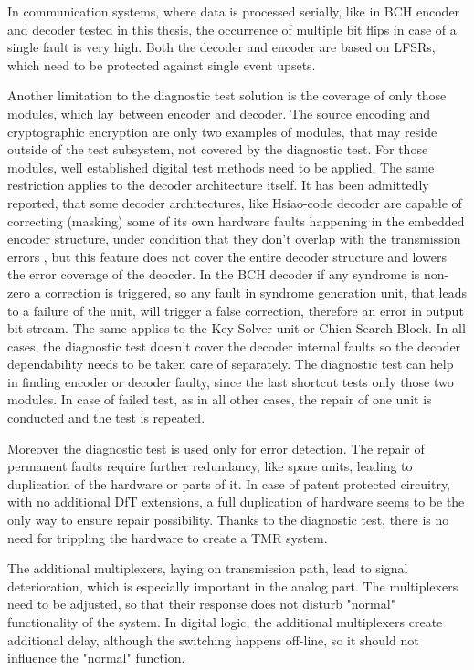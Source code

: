 In communication systems, where data is processed serially, like in BCH encoder and decoder tested in this thesis, the occurrence of multiple bit flips in case of a single fault is very high. Both the decoder and encoder are based on LFSRs, which need to be protected against single event upsets. 

Another limitation to the diagnostic test solution is the coverage of only those modules, which lay between encoder and decoder. The source encoding and cryptographic encryption are only two examples of modules, that may reside outside of the test subsystem, not covered by the diagnostic test. For those modules, well established digital test methods need to be applied. The same restriction applies to the decoder architecture itself. It has been admittedly reported, that some decoder architectures, like Hsiao-code decoder are capable of correcting (masking) some of its own hardware faults happening in the embedded encoder structure, under condition that they don't overlap with the transmission errors \cite{art:Dicorato}, but this feature does not cover the entire decoder structure and lowers the error coverage of the deocder. In the BCH decoder if any syndrome is non-zero a correction is triggered, so any fault in syndrome generation unit, that leads to a failure of the unit, will trigger a false correction, therefore an error in output bit stream. The same applies to the Key Solver unit or Chien Search Block. In all cases, the diagnostic test doesn't cover the decoder internal faults so the decoder dependability needs to be taken care of separately. The diagnostic test can help in finding encoder or decoder faulty, since the last shortcut tests only those two modules. In case of failed test, as in all other cases, the repair of one unit is conducted and the test is repeated.

Moreover the diagnostic test is used only for error detection. The repair of permanent faults require further redundancy, like spare units, leading to duplication of the hardware or parts of it. In case of patent protected circuitry, with no additional DfT extensions, a full duplication of hardware seems to be the only way to ensure repair possibility. Thanks to the diagnostic test, there is no need for trippling the hardware to create a TMR system.

The additional multiplexers, laying on transmission path, lead to signal deterioration, which is especially important in the analog part. The multiplexers need to be adjusted, so that their response does not disturb "normal" functionality of the system. In digital logic, the additional multiplexers create additional delay, although the switching happens off-line, so it should not influence the "normal" function.

